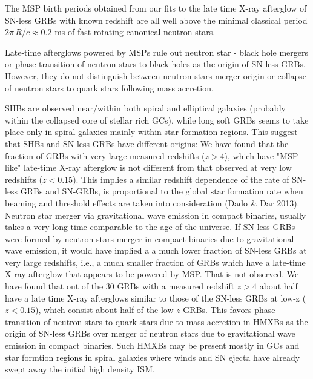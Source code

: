 \documentclass[twocolumn]{aastex61}
\begin{document}
The MSP birth periods obtained from
our fits to the late time X-ray afterglow of SN-less GRBs with known 
redshift are all  well above the minimal classical period 
$2\pi\,R/c\approx 0.2$ ms of fast rotating canonical neutron stars. 

Late-time afterglows powered by MSPs rule out neutron star - black hole 
mergers or phase transition of neutron stars to black holes as the origin 
of SN-less GRBs. However, they do not distinguish between neutron stars 
merger origin or collapse of neutron stars to quark stars following mass 
accretion.

SHBs are observed near/within both spiral and elliptical galaxies 
(probably within the collapsed core of stellar rich GCs), while long soft 
GRBs seems to take place only in spiral galaxies mainly within star 
formation regions. This suggest that SHBs and SN-less GRBs have different 
origins: We have found that the fraction of GRBs with very large measured 
redshifts ($z>4$), which have "MSP-like" late-time X-ray afterglow is not 
different from that observed at very low redshifts ($z<0.15$). This 
implies a similar redshift dependence of the rate of SN-less GRBs and 
SN-GRBs, is proportional to the global star formation rate 
when beaming and threshold effects are taken into consideration
(Dado \& Dar 2013). Neutron star merger via 
gravitational wave emission in compact binaries, usually takes a very long 
time comparable to the age of the universe. If SN-less GRBs were formed by 
neutron stars merger in compact binaries due to gravitational wave 
emission, it would have implied a a much lower fraction of SN-less GRBs at 
very large redshifts, i.e., a much smaller fraction of GRBs which have a 
late-time X-ray afterglow that appears to be powered by MSP. That is not 
observed.  We have found that out of the 30 GRBs with a measured redshift 
$z>4$  about half have a late time X-ray afterglows similar to those of 
the SN-less GRBs at low-z ($z<0.15$), which consist about half of the low 
$z$ GRBs. This favors phase transition of neutron stars to quark stars due 
to mass accretion in HMXBs as the origin of SN-less GRBs over merger of 
neutron stars due to gravitational wave emission in compact binaries. Such 
HMXBs may be present mostly in GCs and star formtion regions in spiral galaxies 
where winds and SN ejecta have already swept away the initial high density 
ISM.
 
\end{document}
